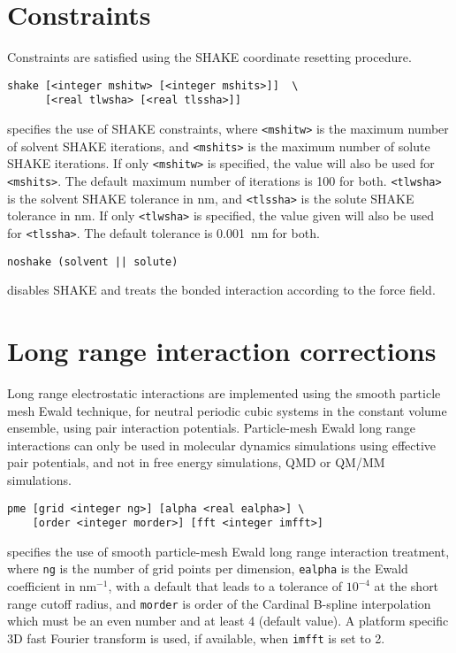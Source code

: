 \section{Constraints}
Constraints are satisfied using the SHAKE 
coordinate resetting procedure.
\begin{description}

\item
\begin{verbatim}
shake [<integer mshitw> [<integer mshits>]]  \
      [<real tlwsha> [<real tlssha>]]
\end{verbatim}
specifies the use of SHAKE constraints,
where \verb+<mshitw>+ is the maximum number of solvent SHAKE iterations,
and \verb+<mshits>+ is the maximum number of solute SHAKE iterations. If
only \verb+<mshitw>+ is specified, the value will also be used for \verb+<mshits>+.
The default maximum number of iterations is 100 for both.
\verb+<tlwsha>+ is the solvent SHAKE tolerance in nm, and \verb+<tlssha>+ is
the solute SHAKE tolerance in nm. If only \verb+<tlwsha>+ is specified, the
value given will also be used for \verb+<tlssha>+. The default tolerance
is 0.001~nm for both.

\item
\begin{verbatim}
noshake (solvent || solute)
\end{verbatim}
disables SHAKE and treats the bonded interaction according to the force 
field.

\end{description}

\section{Long range interaction corrections}
Long range electrostatic interactions are implemented using the
smooth particle mesh Ewald technique, for neutral periodic cubic systems in
the constant volume ensemble, using pair interaction potentials. Particle-mesh
Ewald long range interactions can only be used in molecular dynamics simulations
using effective pair potentials, and not in free energy simulations, QMD or
QM/MM simulations.

\begin{description}
\item
\begin{verbatim}
pme [grid <integer ng>] [alpha <real ealpha>] \
    [order <integer morder>] [fft <integer imfft>] 
\end{verbatim}
specifies the use of smooth particle-mesh Ewald long range
interaction treatment,
where \verb+ng+ is the number of grid points per dimension, 
\verb+ealpha+ is the Ewald coefficient in nm$^{-1}$, with a default
that leads to a tolerance of $10^{-4}$ at the short range cutoff radius, 
and \verb+morder+ is order of the Cardinal B-spline
interpolation which must be an even number and at least 4 (default
value). A platform specific 3D fast Fourier transform is used, if
available, when \verb+imfft+ is set to 2.
\end{description}

